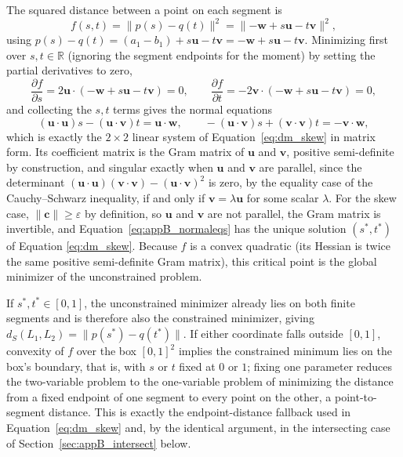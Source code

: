 The squared distance between a point on each segment is
\begin{equation}
f(s,t) = \lVert p(s)-q(t) \rVert^2 = \lVert -\mathbf{w} + s\mathbf{u} - t\mathbf{v} \rVert^2,
\label{eq:appB_objective}
\end{equation}
using $p(s)-q(t) = (a_1-b_1) + s\mathbf{u} - t\mathbf{v} = -\mathbf{w} + s\mathbf{u} - t\mathbf{v}$.
Minimizing first over $s,t \in \mathbb{R}$ (ignoring the segment endpoints for the moment) by
setting the partial derivatives to zero,
\begin{equation}
\frac{\partial f}{\partial s} = 2\mathbf{u}\cdot(-\mathbf{w}+s\mathbf{u}-t\mathbf{v}) = 0, \qquad
\frac{\partial f}{\partial t} = -2\mathbf{v}\cdot(-\mathbf{w}+s\mathbf{u}-t\mathbf{v}) = 0,
\label{eq:appB_gradzero}
\end{equation}
and collecting the $s,t$ terms gives the normal equations
\begin{equation}
(\mathbf{u}\cdot\mathbf{u})s - (\mathbf{u}\cdot\mathbf{v})t = \mathbf{u}\cdot\mathbf{w}, \qquad
-(\mathbf{u}\cdot\mathbf{v})s + (\mathbf{v}\cdot\mathbf{v})t = -\mathbf{v}\cdot\mathbf{w},
\label{eq:appB_normaleqs}
\end{equation}
which is exactly the $2\times2$ linear system of Equation~\eqref{eq:dm_skew} in matrix form. Its
coefficient matrix is the Gram matrix of $\mathbf{u}$ and $\mathbf{v}$, positive semi-definite by
construction, and singular exactly when $\mathbf{u}$ and $\mathbf{v}$ are parallel, since the
determinant $(\mathbf{u}\cdot\mathbf{u})(\mathbf{v}\cdot\mathbf{v}) - (\mathbf{u}\cdot\mathbf{v})^2$
is zero, by the equality case of the Cauchy--Schwarz inequality, if and only if $\mathbf{v} =
\lambda\mathbf{u}$ for some scalar $\lambda$. For the skew case, $\lVert\mathbf{c}\rVert \geq
\varepsilon$ by definition, so $\mathbf{u}$ and $\mathbf{v}$ are not parallel, the Gram matrix is
invertible, and Equation~\eqref{eq:appB_normaleqs} has the unique solution $(s^*, t^*)$ of Equation
\eqref{eq:dm_skew}. Because $f$ is a convex quadratic (its Hessian is twice the same positive
semi-definite Gram matrix), this critical point is the global minimizer of the unconstrained problem.

If $s^*, t^* \in [0,1]$, the unconstrained minimizer already lies on both finite segments and is
therefore also the constrained minimizer, giving $d_S(L_1,L_2) = \lVert p(s^*)-q(t^*) \rVert$. If
either coordinate falls outside $[0,1]$, convexity of $f$ over the box $[0,1]^2$ implies the
constrained minimum lies on the box's boundary, that is, with $s$ or $t$ fixed at $0$ or $1$; fixing
one parameter reduces the two-variable problem to the one-variable problem of minimizing the distance
from a fixed endpoint of one segment to every point on the other, a point-to-segment distance. This
is exactly the endpoint-distance fallback used in Equation~\eqref{eq:dm_skew} and, by the identical
argument, in the intersecting case of Section~\ref{sec:appB_intersect} below.


